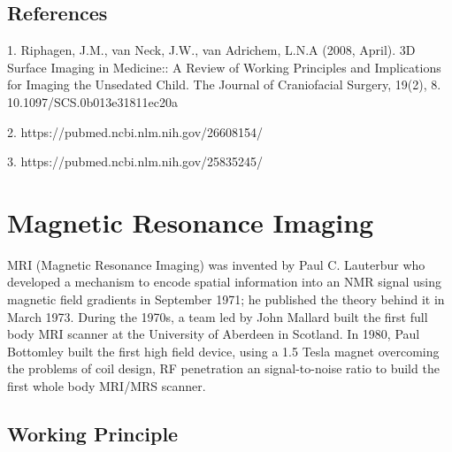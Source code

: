 \documentclass[11pt]{article}
\begin{document}
\subsection*{\centering References}



1. Riphagen, J.M., van Neck, J.W., van Adrichem, L.N.A (2008, April). 3D Surface Imaging in Medicine:: A Review of Working Principles and Implications for Imaging the Unsedated Child. The Journal of Craniofacial Surgery, 19(2), 8. 10.1097/SCS.0b013e31811ec20a



2. https://pubmed.ncbi.nlm.nih.gov/26608154/



3. https://pubmed.ncbi.nlm.nih.gov/25835245/

\pagebreak

\section*{\centering Magnetic Resonance Imaging}

MRI (Magnetic Resonance Imaging) was invented by Paul C. Lauterbur who developed a mechanism to encode spatial information into an NMR signal using magnetic field gradients in September 1971; he published the theory behind it in March 1973. During the 1970s, a team led by John Mallard built the first full body MRI scanner at the University of Aberdeen in Scotland. In 1980, Paul Bottomley built the first high field device, using a 1.5 Tesla magnet overcoming the problems of coil design, RF penetration an signal-to-noise ratio to build the first whole body MRI/MRS scanner.

\subsection*{Working Principle} 
\end{document}
